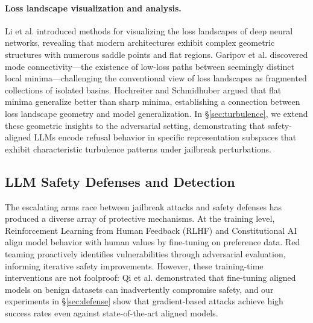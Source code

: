 \documentclass[preprint,12pt]{elsarticle}
\begin{document}
\paragraph{Loss landscape visualization and analysis.} Li et al. \cite{li2018visualizing} introduced methods for visualizing the loss landscapes of deep neural networks, revealing that modern architectures exhibit complex geometric structures with numerous saddle points and flat regions. Garipov et al. \cite{garipov2018loss} discovered mode connectivity---the existence of low-loss paths between seemingly distinct local minima---challenging the conventional view of loss landscapes as fragmented collections of isolated basins. Hochreiter and Schmidhuber \cite{hochreiter1997flat} argued that flat minima generalize better than sharp minima, establishing a connection between loss landscape geometry and model generalization. In \S\ref{sec:turbulence}, we extend these geometric insights to the adversarial setting, demonstrating that safety-aligned LLMs encode refusal behavior in specific representation subspaces that exhibit characteristic turbulence patterns under jailbreak perturbations.

\subsection{LLM Safety Defenses and Detection}
\label{sec:rw_defense}

The escalating arms race between jailbreak attacks and safety defenses has produced a diverse array of protective mechanisms. At the training level, Reinforcement Learning from Human Feedback (RLHF) \cite{ouyang2022training} and Constitutional AI \cite{bai2022constitutional} align model behavior with human values by fine-tuning on preference data. Red teaming \cite{perez2022red} proactively identifies vulnerabilities through adversarial evaluation, informing iterative safety improvements. However, these training-time interventions are not foolproof: Qi et al. \cite{qi2023fine} demonstrated that fine-tuning aligned models on benign datasets can inadvertently compromise safety, and our experiments in \S\ref{sec:defense} show that gradient-based attacks achieve high success rates even against state-of-the-art aligned models.
\end{document}
